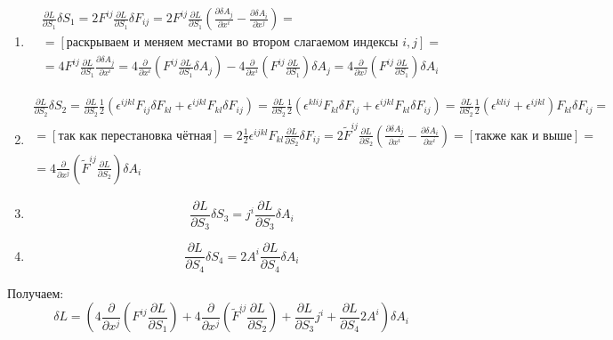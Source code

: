 \begin{enumerate}
	\item 
	\[
		\begin{gathered}
		\frac{\partial L}{\partial S_1} \delta S_1 = 2 F^{ij} \frac{\partial L}{\partial S_1} \delta F_{ij} = 
		2 F^{ij} \frac{\partial L}{\partial S_1} \left(\frac{\partial \delta A_j}{\partial x^i} - \frac{\partial \delta A_i}{\partial x^j} \right)
		= \\ =
		[\text{раскрываем и меняем местами во втором слагаемом индексы $i, j$} ] = \\ =
		4 F^{ij} \frac{\partial L}{\partial S_1} \frac{\partial \delta A_j}{\partial x^i} = 
		4 \frac{\partial }{\partial x^i} \left(F^{ij} \frac{\partial L}{\partial S_1} \delta A_j \right) - 4 \frac{\partial}{\partial x^i} \left(F^{ij} \frac{\partial L}{\partial S_1} \right) \delta A_j =
		4 \frac{\partial}{\partial x^j} \left(F^{ij} \frac{\partial L}{\partial S_1} \right) \delta A_i
		\end{gathered}
	\]
	\item 
	\[
		\begin{gathered}
		\frac{\partial L}{\partial S_2} \delta S_2 = \frac{\partial L}{\partial S_2} \frac{1}{2}\left(\epsilon^{ijkl} F_{ij} \delta F_{kl} +  \epsilon^{ijkl} F_{kl} \delta F_{ij} \right)
		= \frac{\partial L}{\partial S_2} \frac{1}{2}\left(\epsilon^{klij} F_{kl} \delta F_{ij} +  \epsilon^{ijkl} F_{kl} \delta F_{ij} \right)
		= \frac{\partial L}{\partial S_2} \frac{1}{2}(\epsilon^{klij} + \epsilon^{ijkl}) F_{kl} \delta F_{ij} = 
		\\ =
		[\text{так как перестановка чётная}] 
		= 2 \frac{1}{2} \epsilon^{ijkl} F_{kl} \frac{\partial L}{\partial S_2} \delta F_{ij}
		= 2 \tilde{F}^{ij} \frac{\partial L}{\partial S_2} \left(\frac{\partial \delta A_j}{\partial x^i} - \frac{\partial \delta A_i}{\partial x^i} \right)
		= [\text{также как и выше}] = \\
		= 4 \frac{\partial}{\partial x^j} \left(\tilde{F}^{ij} \frac{\partial L}{\partial S_2} \right) \delta A_i
		\end{gathered}
	\]
	\item
	\[
		\frac{\partial L}{\partial S_3} \delta S_3 = j^i \frac{\partial L}{\partial S_3} \delta A_i
	\]
	\item 
	\[
		\frac{\partial L}{\partial S_4} \delta S_4 = 2 A^i \frac{\partial L}{\partial S_4}  \delta A_i
	\]
\end{enumerate}
Получаем:
\[
	\delta L = 
	\left(
	4 \frac{\partial}{\partial x^j} \left(F^{ij} \frac{\partial L}{\partial S_1} \right) + 
	4 \frac{\partial}{\partial x^j} \left(\tilde{F}^{ij} \frac{\partial L}{\partial S_2} \right) +
	\frac{\partial L}{\partial S_3} j^i + 
	\frac{\partial L}{\partial S_4} 2 A^i
	\right) \delta A_i
\]
